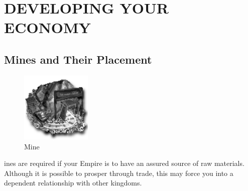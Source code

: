
\chapter{\textsf{DEVELOPING YOUR ECONOMY}}


\section{\textsf{Mines and Their Placement}}


\begin{figure}
    \vspace{-20pt}
    \begin{center}
        \includegraphics[width=0.3\textwidth]{Imine} %
        \\ Mine
    \end{center}
    \vspace{-30pt} %
\end{figure}

ines are required if your Empire is to have an assured source of raw materials. Although it is possible to prosper through trade, this may force you into a dependent relationship with other kingdoms.

